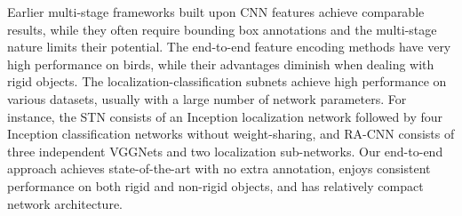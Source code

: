 \documentclass[10pt,twocolumn,letterpaper]{article}
\begin{document}
Earlier multi-stage frameworks built upon CNN features achieve comparable results, while they often require bounding box
annotations and the multi-stage nature limits
their potential. The end-to-end feature encoding methods have very high performance on
birds, while their advantages diminish when dealing with rigid objects. The localization-classification subnets achieve
high performance on various datasets, usually with a large number of network parameters. For instance, the STN
\cite{stn} consists of an Inception localization network followed by four Inception classification networks without
weight-sharing, and RA-CNN \cite{taomei1} consists of three independent VGGNets and two localization sub-networks. 
Our end-to-end approach achieves state-of-the-art with no extra
annotation, enjoys consistent performance on both rigid and non-rigid objects, and has relatively compact network architecture.
\begin{table}
\centering
{}
\vspace{1pt}
\caption{\label{tb2}Comparison of our approach (DFL-CNN) to recent results on
CUB-200-2011, \textbf{without} extra annotations (if not specified). For the
finetuned (FT) baselines, we cite the best previously reported result if it is better than our implementation. The
black-bold number represents the best previous result.}
\vspace{-10pt}
\end{table}
\end{document}
